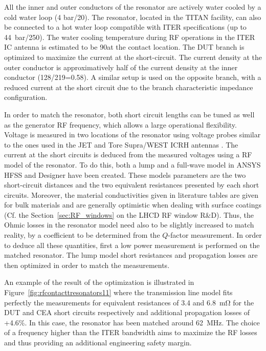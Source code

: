 {All the inner and outer conductors of the resonator are actively water cooled by a cold water loop (4 bar/20\degC). The resonator, located in the TITAN facility, can also be connected to a hot water loop compatible with ITER specifications (up to 44~bar/250\degC). The water cooling temperature during RF operations in the ITER IC antenna is estimated to be 90\degC at the contact location. The DUT branch is optimized to maximize the current at the short-circuit. The current density at the outer conductor is approximatively half of the current density at the inner conductor (128/219=0.58). A similar setup is used on the opposite branch, with a reduced current at the short circuit due to the branch characteristic impedance configuration.

In order to match the resonator, both short circuit lengths can be tuned as well as the generator RF frequency, which allows a large operational flexibility. Voltage is measured in two locations of the resonator using voltage probes similar to the ones used in the JET and Tore Supra/WEST ICRH antennas . The current at the short circuits is deduced from the measured voltages using a RF model of the resonator. To do this, both a lump and a full-wave model in ANSYS HFSS and Designer have been created. These models parameters are the two short-circuit distances and the two equivalent resistances presented by each short circuits. Moreover, the material conductivities given in literature tables are given for bulk materials and are generally optimistic when dealing with surface coatings (Cf. the Section~\ref{sec:RF_windows} on the LHCD RF window R\&D). Thus, the Ohmic losses in the resonator model need also to be slightly increased to match reality, by a coefficient to be determined from the $Q$-factor measurement. In order to deduce all these quantities, first a low power measurement is performed on the matched resonator. The lump model short resistances and propagation losses are then optimized in order to match the measurements. 

An example of the result of the optimization is illustrated in Figure~\ref{fig:rfcontacttresonators11} where the transmission line model fits perfectly the measurements for equivalent resistances of 3.4 and 6.8~mΩ for the DUT and CEA short circuits respectively and additional propagation losses of +4.6\%. In this case, the resonator has been matched around 62~MHz. The choice of a frequency higher than the ITER bandwidth aims to maximize the RF losses and thus providing an additional engineering safety margin. 

}
